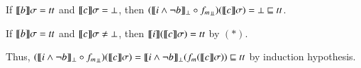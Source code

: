 \documentclass{report}[12pt]
\begin{document}
If $\llbracket b \rrbracket \sigma = tt$ and $\llbracket c \rrbracket\sigma = \bot$, then $(\interp{i \wedge \neg b}_\bot \circ {f_m}_\bbot)(\interp{c}\sigma)=\bot \sqsubseteq tt$.

If $\llbracket b \rrbracket\sigma = tt$ and $\llbracket c \rrbracket\sigma \neq \bot$, then $\llbracket i \rrbracket(\llbracket c \rrbracket\sigma) = tt$ by $(\ast)$.

Thus, $(\interp{i \wedge \neg b}_\bot \circ {f_m}_\bbot)(\interp{c}\sigma) = \interp{i \wedge \neg b}_\bot (f_m (\interp{c}\sigma)) \sqsubseteq tt$ by induction hypothesis.
\end{document}
